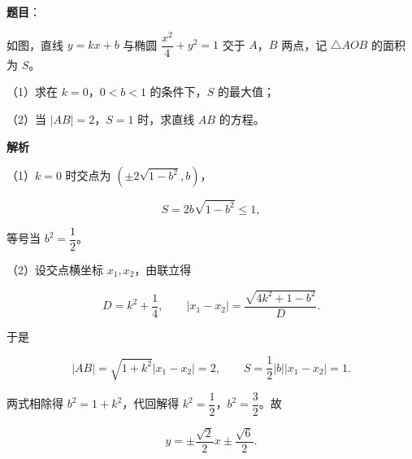 \begin{answer}

\textbf{题目}：

如图，直线 $y=kx+b$ 与椭圆 $\dfrac{x^2}{4}+y^2=1$ 交于 $A$，$B$ 两点，记 $\triangle AOB$ 的面积为 $S$。

（1）求在 $k=0$，$0<b<1$ 的条件下，$S$ 的最大值；

（2）当 $|AB|=2$，$S=1$ 时，求直线 $AB$ 的方程。
\nopagebreak[4]
\begin{center}\end{center}
\nopagebreak[4]
\textbf{解析}

（1）$k=0$ 时交点为 $\left(\pm2\sqrt{1-b^2},b\right)$，

\nopagebreak[4]
\[S=2b\sqrt{1-b^2}\leqslant1,\]

等号当 $b^2=\dfrac12$。

（2）设交点横坐标 $x_1,x_2$，由联立得

\nopagebreak[4]
\[D=k^2+\frac14,\qquad |x_1-x_2|=\frac{\sqrt{4k^2+1-b^2}}{D}.\]

于是

\nopagebreak[4]
\[|AB|=\sqrt{1+k^2}|x_1-x_2|=2,\qquad S=\frac12|b||x_1-x_2|=1.\]

两式相除得 $b^2=1+k^2$，代回解得 $k^2=\dfrac12$，$b^2=\dfrac32$。故

\nopagebreak[4]
\[y=\pm\frac{\sqrt2}{2}x\pm\frac{\sqrt6}{2}.\]


\end{answer}
